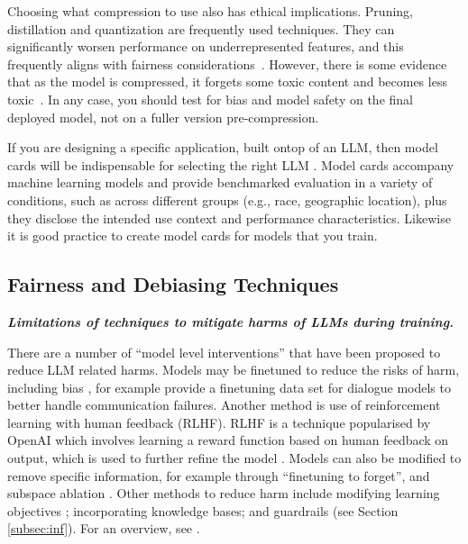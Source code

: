 Choosing what compression to use also has ethical implications. Pruning, distillation and quantization are frequently used techniques. They can significantly worsen performance on underrepresented features, and this frequently aligns with fairness considerations~\citep{ramesh_comparative_2023, hooker_characterising_2020}. However,
there is some evidence that as the model is compressed, it forgets
some toxic content and becomes less
toxic~\cite{xu_can_2022}. In any case, you should test for bias and model safety on the final deployed model, not on a fuller version pre-compression. 

If you are designing a specific application, built ontop of an LLM, then model cards will be indispensable for selecting the right LLM \citep{mitchell_model_2019}. Model cards accompany machine learning models and provide benchmarked evaluation in a variety of conditions, such as across different groups (e.g., race, geographic location), plus they disclose the intended use context and performance characteristics. Likewise it is good practice to create model cards for models that you train. 


\subsection{Fairness and Debiasing Techniques}\label{sec:debias} \noindent\textbf{\textit{Limitations of techniques to mitigate harms of LLMs during training.}}
\newline 

\noindent There are a number of ``model level interventions'' \citep{kumar_language_2022} that have been proposed to reduce LLM related harms. Models may be finetuned to reduce the risks of harm, including bias \citep{subramanian_fairness-aware_2021}, for example \citet{ung_saferdialogues_2022} provide a finetuning data set for dialogue models to better handle communication failures. Another method is use of reinforcement learning with human feedback (RLHF). RLHF is a technique popularised by OpenAI which involves learning a reward function based on human feedback on output, which is used to further refine the model \citep{huang_survey_2023}. Models can also be modified to remove specific information, for example through ``finetuning to forget'', and subspace ablation \citep{anwar2024foundational}. Other methods to reduce harm include modifying learning objectives \citep{guo_auto-debias_2022}; incorporating knowledge bases; and guardrails (see Section \cref{subsec:inf}). For an overview, see \citet{kumar_language_2022}.

